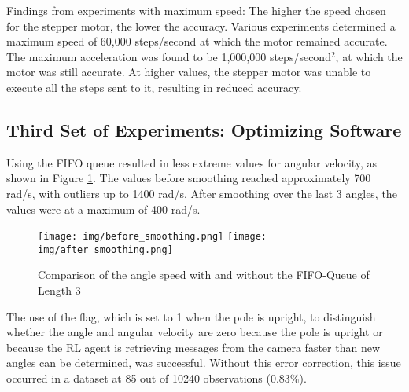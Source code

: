 Findings from experiments with maximum speed: The higher the speed chosen for the stepper motor, the lower the accuracy. Various experiments determined a maximum speed of 60,000 steps/second at which the motor remained accurate. The maximum acceleration was found to be 1,000,000 steps/second$^2$, at which the motor was still accurate. At higher values, the stepper motor was unable to execute all the steps sent to it, resulting in reduced accuracy.

\subsection{Third Set of Experiments: Optimizing Software}
Using the FIFO queue resulted in less extreme values for angular velocity, as shown in Figure \ref{fig:before_after_smoothing}. The values before smoothing reached approximately 700 rad/s, with outliers up to 1400 rad/s. After smoothing over the last 3 angles, the values were at a maximum of 400 rad/s.
\begin{figure}[htbp]
    \centering
    \texttt{[image: img/before\_smoothing.png]}
    \texttt{[image: img/after\_smoothing.png]}
    \caption{Comparison of the angle speed with and without the FIFO-Queue of Length 3}
    \label{fig:before_after_smoothing}
\end{figure}
The use of the flag, which is set to 1 when the pole is upright, to distinguish whether the angle and angular velocity are zero because the pole is upright or because the RL agent is retrieving messages from the camera faster than new angles can be determined, was successful. Without this error correction, this issue occurred in a dataset at 85 out of 10240 observations (0.83\%).


